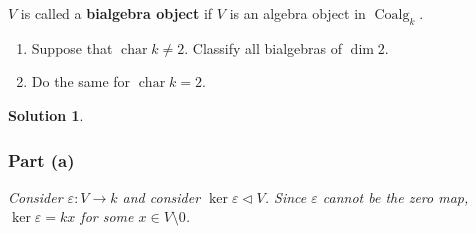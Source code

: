 \documentclass[12pt]{article}
\theoremstyle{nonumberbreak}
\newtheorem{sol}{Solution}
\theoremstyle{changebreak}
\theoremstyle{break}
\theoremstyle{nonumberbreak}
\theoremstyle{nonumberplain}
\theoremstyle{change}
\DeclareMathOperator{\ch}{char}
\newcommand*{\Coalgk}{\operatorname{Coalg}_k}
\begin{document}
\begin{defn}
	$V$ is called a \textbf{bialgebra object} if $V$ is an algebra object in $\Coalgk$.
\end{defn}

\begin{prob}
	\begin{enumerate}
		\item Suppose that $\ch k\ne 2$. Classify all bialgebras of $\dim 2.$
		\item Do the same for $\ch k = 2.$
	\end{enumerate}
\end{prob}
\begin{sol}
	\subsubsection*{Part (a)}
	Consider $\varepsilon:V\to k$ and consider $\ker\varepsilon\lhd V$. Since $\varepsilon$ cannot be the zero map,
	$\ker\varepsilon=kx$ for some $x\in V\setminus 0$. 
\end{sol}
\end{document}
